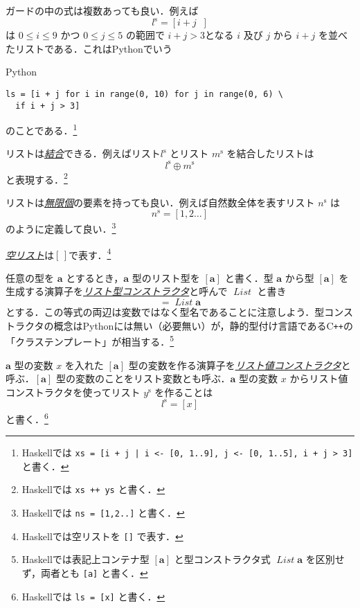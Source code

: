 \documentclass[a4paper,draft]{jsbook}
\newcommand{\programminglanguage}[1]{\textsf{#1}}
\newcommand{\cxx}{\programminglanguage{C}\texttt{++}}
\newcommand{\haskell}{\programminglanguage{Haskell}}
\newcommand{\python}{\programminglanguage{Python}}
\newcommand{\keyword}[1]{{\underline{\emph{#1}}}}
\newcommand{\code}[1]{\texttt{#1}}
\newenvironment{pythoncode}{\begin{itembox}[r]{\python}}{\end{itembox}}
\newcommand{\mType}[1]{\mathbf{#1}}
\newcommand{\mListType}[1]{[\mType{#1}]}
\newcommand{\mTypeConstructor}[1]{\mathit{#1}} %
\newcommand{\mEmptyList}{{[\,]}}
\newcommand{\mListOf}[1]{\left[#1\right]}
\newcommand{\mListVar}[1]{{#1}^\mathrm{s}}
\newcommand{\mGuard}[1]{\mathop{\mid_{#1}}}
\DeclareMathOperator{\mAppend}{\oplus}
\DeclareMathOperator{\mFrom}{\in}
\DeclareMathOperator{\mListTypeConstructor}{\mTypeConstructor{List}}
\begin{document}
ガードの中の式は複数あっても良い．例えば
\begin{equation}
\mListVar{l}
=\mListOf{i+j\mGuard{i\mFrom\mListOf{0,1\dots9},\,j\mFrom\mListOf{0,1\dots5},\,i+j>3}}
\end{equation}
は $0\le i\le9$ かつ $0\le j\le5$ の範囲で $i+j>3$となる $i$ 及び $j$ から $i+j$ を並べたリストである．これは\python でいう
\begin{pythoncode}
\begin{verbatim}
ls = [i + j for i in range(0, 10) for j in range(0, 6) \
  if i + j > 3]
\end{verbatim}
\end{pythoncode}
のことである．\footnote{\haskell では \code{xs = [i + j | i <- [0, 1..9], j <- [0, 1..5], i + j > 3]} と書く．}

リストは\keyword{結合}できる．例えばリスト$\mListVar{l}$ とリスト $\mListVar{m}$ を結合したリストは
\begin{equation}
\mListVar{l}\mAppend\mListVar{m}
\end{equation}
と表現する．\footnote{\haskell では \code{xs ++ ys} と書く．}

リストは\keyword{無限個}の要素を持っても良い．例えば自然数全体を表すリスト $\mListVar{n}$ は
\begin{equation}
\mListVar{n}=\mListOf{1,2\dots}
\end{equation}
のように定義して良い．\footnote{\haskell では \code{ns = [1,2..]} と書く．}

\keyword{空リスト}は$\mEmptyList$で表す．\footnote{\haskell では空リストを \code{[]} で表す．}

任意の型を $\mType{a}$ とするとき，$\mType{a}$ 型のリスト型を $\mListType{a}$ と書く．型 $\mType{a}$ から型 $\mListType{a}$ を生成する演算子を\keyword{リスト型コンストラクタ}と呼んで $\mListTypeConstructor$ と書き
\begin{equation}
\mListType{a}=\mListTypeConstructor\mType{a}
\end{equation}
とする．この等式の両辺は変数ではなく型名であることに注意しよう．型コンストラクタの概念は\python には無い（必要無い）が，静的型付け言語である\cxx の「クラステンプレート」が相当する．\footnote{\haskell では表記上コンテナ型 $\mListType{a}$ と型コンストラクタ式 $\mListTypeConstructor\mType{a}$ を区別せず，両者とも \code{[a]} と書く．}

$\mType{a}$ 型の変数 $x$ を入れた $\mListType{a}$ 型の変数を作る演算子を\keyword{リスト値コンストラクタ}と呼ぶ．$\mListType{a}$ 型の変数のことをリスト変数とも呼ぶ．$\mType{a}$ 型の変数 $x$ からリスト値コンストラクタを使ってリスト $\mListVar{y}$ を作ることは
\begin{equation}
\mListVar{l}=\mListOf{x}
\end{equation}
と書く．\footnote{\haskell では \code{ls = [x]} と書く．}
\end{document}
